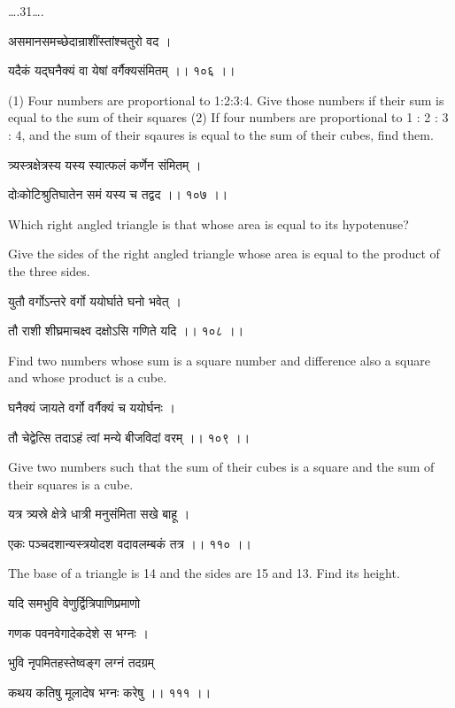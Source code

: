 \documentclass[]{article}
\date{}
\begin{document}
{\ldots{}.31\ldots{}.}

{असमानसमच्छेदान्राशींस्तांश्चतुरो वद । }

{यदैकं यद्घनैक्यं वा येषां वर्गैक्यसंमितम् ।। १०६ ।। }

{(1) Four numbers are proportional to 1:2:3:4. Give those numbers if
their sum is equal to the sum of their squares (2) If four numbers are
proportional to 1 : 2 : 3 : 4, and the sum of their sqaures is equal to
the sum of their cubes, find them.}

{त्र्यस्त्रक्षेत्रस्य यस्य स्यात्फलं कर्णेन संमितम् । }

{दोःकोटिश्रुतिघातेन समं यस्य च तद्वद ।। १०७ ।।}{ }

{Which right angled triangle is that whose area is equal to its
hypotenuse?}

{Give the sides of the right angled triangle whose area is equal to the
product of the three sides.}

{युतौ वर्गोऽन्तरे वर्गो ययोर्घाते घनो भवेत् । }

{तौ राशी शीघ्रमाचक्ष्व दक्षोऽसि गणिते यदि ।। १०८ ।। }

{Find two numbers whose sum is a square number and difference also a
square and whose product is a cube. }

{घनैक्यं जायते वर्गो वर्गैक्यं च ययोर्घनः । }

{तौ चेद्वेत्सि तदाऽहं त्वां मन्ये बीजविदां वरम् ।। १०९ ।। }

{Give two numbers such that the sum of their cubes is a square and the
sum of their squares is a cube.}

{यत्र त्र्यस्रे क्षेत्रे धात्री मनुसंमिता सखे बाहू । }

{एकः पञ्चदशान्यस्त्रयोदश वदावलम्बकं तत्र ।। ११० ।। }

{The base of a triangle is 14 and the sides are 15 and 13. Find its
height.}

{यदि समभुवि वेणुर्द्वित्रिपाणिप्रमाणो }

{गणक पवनवेगादेकदेशे स भग्नः । }

{भुवि नृपमितहस्तेष्वङ्ग लग्नं तदग्रम् }

{कथय कतिषु मूलादेष भग्नः करेषु ।। १११ ।।\\
}
\end{document}
